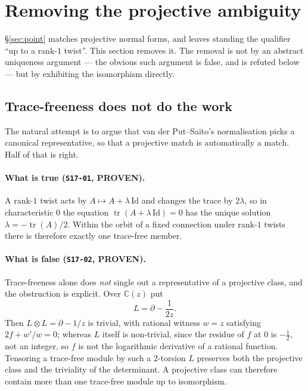 \section{Removing the projective ambiguity}\label{sec:projective}

\S\ref{sec:point} matches projective normal forms, and leaves standing the
qualifier ``up to a rank-$1$ twist''. This section removes it. The removal is
not by an abstract uniqueness argument --- the obvious such argument is false,
and is refuted below --- but by exhibiting the isomorphism directly.

\subsection{Trace-freeness does not do the work}\label{ssec:tracefree}

The natural attempt is to argue that van der Put--Saito's normalisation picks a
canonical representative, so that a projective match is automatically a match.
Half of that is right.

\paragraph{What is true (\texttt{S17-01}, \textbf{PROVEN}).}
A rank-$1$ twist acts by $A\mapsto A+\lambda\,\mathrm{Id}$ and changes the
trace by $2\lambda$, so in characteristic $0$ the equation
$\operatorname{tr}(A+\lambda\,\mathrm{Id})=0$ has the unique solution
$\lambda=-\operatorname{tr}(A)/2$. Within the orbit of a fixed connection under
rank-$1$ twists there is therefore exactly one trace-free member.

\paragraph{What is false (\texttt{S17-02}, \textbf{PROVEN}).}\label{par:tracefree-false}
Trace-freeness alone does \emph{not} single out a representative of a
projective class, and the obstruction is explicit. Over $\mathbb C(z)$ put
\[
  L=\partial-\frac{1}{2z}.
\]
Then $L\otimes L=\partial-1/z$ is trivial, with rational witness $w=z$
satisfying $2f+w'/w=0$; whereas $L$ itself is non-trivial, since the residue of
$f$ at $0$ is $-\tfrac12$, not an integer, so $f$ is not the logarithmic
derivative of a rational function. Tensoring a trace-free module by such a
$2$-torsion $L$ preserves both the projective class and the triviality of the
determinant. A projective class can therefore contain more than one trace-free
module up to isomorphism.


